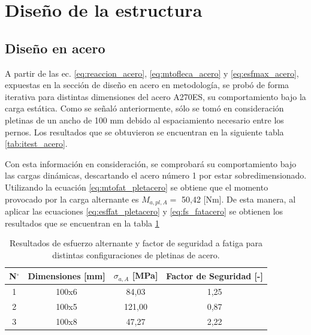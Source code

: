 \section{Diseño de la estructura}
\subsection{Diseño en acero}
A partir de las ec. \ref{eq:reaccion_acero}, \ref{eq:mtofleca_acero} y \ref{eq:esfmax_acero}, expuestas en la sección de diseño en acero en metodología, se probó de forma iterativa para distintas dimensiones del acero A270ES, su comportamiento bajo la carga estática. Como se señaló anteriormente, sólo se tomó en consideración pletinas de un ancho de 100 mm debido al espaciamiento necesario entre los pernos. Los resultados que se obtuvieron se encuentran en la siguiente tabla \ref{tab:itest_acero}.

\begin{table}[h]
\centering
{}
\caption{Resultados y factor de seguridad para distintas configuraciones de pletinas de acero.}
\label{tab:itest_acero}
\end{table}

Con esta información en consideración, se comprobará su comportamiento bajo las cargas dinámicas, descartando el acero número 1 por estar sobredimensionado. Utilizando la ecuación \ref{eq:mtofat_pletacero} se obtiene que el momento provocado por la carga alternante es $M_{a,pl,A} =$ 50,42 [Nm]. De esta manera, al aplicar las ecuaciones \ref{eq:esffat_pletacero} y \ref{eq:fs_fatacero} se obtienen los resultados que se encuentran en la tabla \ref{tab:itfat_acero}

\begin{table}[h]
\centering
\begin{tabular}{@{}cccc@{}}
\toprule
N$^{\circ}$ & Dimensiones [mm] & $\sigma_{a,A}$ [MPa] & Factor de Seguridad [-] \\ \midrule
1 & 100x6 & 84,03 & 1,25 \\
2 & 100x5 & 121,00 & 0,87 \\
3 & 100x8 & 47,27 & 2,22 \\ \bottomrule
\end{tabular}
\caption{Resultados de esfuerzo alternante y factor de seguridad a fatiga para distintas configuraciones de pletinas de acero.}
\label{tab:itfat_acero}
\end{table}

